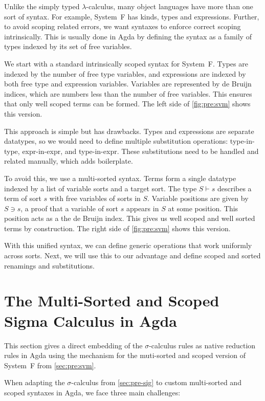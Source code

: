 \documentclass[screen,nonacm]{acmart}
\begin{document}
Unlike the simply typed $\lambda$-calculus, many object languages have more
than one sort of syntax. For example, System~F has kinds, types and
expressions. Further, to avoid scoping
related errors, we want syntaxes to enforce correct scoping intrinsically. This
is usually done in Agda by defining the syntax as a family of types indexed by
its set of free variables.

We start with a standard intrinsically scoped syntax for System~F. Types are
indexed by the number of free type variables, and expressions are indexed by
both free type and expression variables. Variables are represented by de Bruijn
indices, which are numbers less than the number of free variables. This ensures
that only well scoped terms can be formed. The left side of \cref{fig:pre:svm}
shows this version.

This approach is simple but has drawbacks. Types and expressions are separate
datatypes, so we would need to define multiple substitution operations:
type-in-type, expr-in-expr, and type-in-expr. These substitutions need to be
handled and related manually, which adds boilerplate.

To avoid this, we use a multi-sorted syntax. Terms form a single datatype
indexed by a list of variable sorts and a target sort. The type $S \vdash s$
describes a term of sort $s$ with free variables of sorts in $S$. Variable
positions are given by $S \ni s$, a proof that a variable of sort $s$ appears
in $S$ at some position. This position acts as a the de Bruijn index. This
gives us well scoped and well sorted terms by construction. The right side of
\cref{fig:pre:svm} shows this version.

With this unified syntax, we can define generic operations that work uniformly
across sorts. Next, we will use this to our advantage and define scoped and
sorted renamings and substitutions.

\section{The Multi-Sorted and Scoped Sigma Calculus in Agda}\label{sec:mis}

This section gives a direct embedding of the $\sigma$-calculus rules as native
reduction rules in Agda using the  mechanism for the
muti-sorted and scoped version of System~F from \cref{sec:pre:svm}.

When adapting the $\sigma$-calculus from \cref{sec:pre-sig} to custom
multi-sorted and scoped syntaxes in Agda, we face three main challenges:
\end{document}
